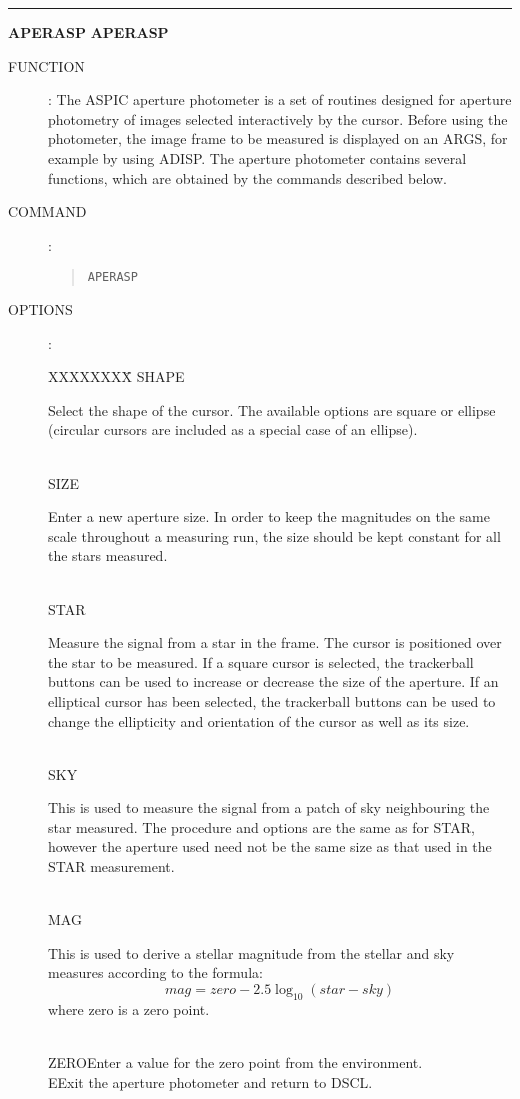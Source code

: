 \goodbreak
\rule{\textwidth}{0.3mm}
{\Large {\bf APERASP} \hfill {\bf APERASP}}
\begin{description}
\item [FUNCTION]:
The ASPIC aperture photometer is a set of routines designed for aperture
photometry of images selected interactively by the cursor.
Before using the photometer, the image frame to be measured is displayed on an
ARGS, for example by using ADISP.
The aperture photometer contains several functions, which are obtained by the
commands described below.
\item [COMMAND]:
\begin{quote}
{\tt APERASP}
\end{quote}
\item [OPTIONS]:
\begin{tabbing}
XXXXXXXX\=\kill
SHAPE\>\begin{minipage}[t]{120mm}
Select the shape of the cursor.
The available options are square or ellipse (circular cursors are included as
a special case of an ellipse).
\end{minipage}\\
SIZE\>\begin{minipage}[t]{120mm}
Enter a new aperture size.
In order to keep the magnitudes on the same scale throughout a measuring run,
the size should be kept constant for all the stars measured.
\end{minipage}\\
STAR\>\begin{minipage}[t]{120mm}
Measure the signal from a star in the frame.
The cursor is positioned over the star to be measured.
If a square cursor is selected, the trackerball buttons can be used to increase
or decrease the size of the aperture.
If an elliptical cursor has been selected, the trackerball buttons can be used
to change the ellipticity and orientation of the cursor as well as its size.
\end{minipage}\\
SKY\>\begin{minipage}[t]{120mm}
This is used to measure the signal from a patch of sky neighbouring the star
measured.
The procedure and options are the same as for STAR, however the aperture used
need not be the same size as that used in the STAR measurement.
\end{minipage}\\
MAG\>\begin{minipage}[t]{120mm}
This is used to derive a stellar magnitude from the stellar and sky measures
according to the formula:
\[mag = zero - 2.5 \log_{10}  (star - sky)\]
where zero is a zero point.
\end{minipage}\\
ZERO\>Enter a value for the zero point from the environment.\\
E\>Exit the aperture photometer and return to DSCL.
\end{tabbing}
\end{description}

